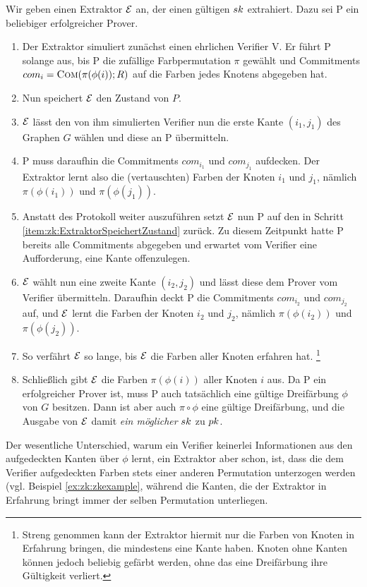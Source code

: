 \begin{beweis}
	Wir geben einen Extraktor $\mathcal{E}$ an, der einen gültigen $sk$ extrahiert. Dazu sei P ein beliebiger erfolgreicher Prover.
	
	\begin{enumerate}
		\item Der Extraktor simuliert zunächst einen ehrlichen Verifier V. Er führt P solange aus, bis P die zufällige Farbpermutation $\pi$ gewählt und Commitments $com_i = \textsc{Com}(\pi(\phi(i));R)$ auf die Farben jedes Knotens abgegeben hat.	
		\item \label{item:zk:ExtraktorSpeichertZustand}
		Nun speichert $\mathcal{E}$ den Zustand von $P$.
		\item $\mathcal{E}$ lässt den von ihm simulierten Verifier nun die erste Kante $(i_1, j_1)$ des Graphen $G$ wählen und diese an P übermitteln.
		\item P muss daraufhin die Commitments $com_{i_1}$ und $com_{j_1}$ aufdecken. Der Extraktor lernt also die (vertauschten) Farben der Knoten $i_1$ und $j_1$, nämlich $\pi(\phi(i_1))$ und $\pi(\phi(j_1))$.
		\item Anstatt des Protokoll weiter auszuführen setzt $\mathcal{E}$ nun P auf den in Schritt \ref{item:zk:ExtraktorSpeichertZustand} zurück. Zu diesem Zeitpunkt hatte P bereits alle Commitments abgegeben und erwartet vom Verifier eine Aufforderung, eine Kante offenzulegen.
		\item $\mathcal{E}$ wählt nun eine zweite Kante $(i_2, j_2)$ und lässt diese dem Prover vom Verifier übermitteln. Daraufhin deckt P die Commitments $com_{i_2}$ und $com_{j_2}$ auf, und $\mathcal{E}$ lernt die Farben der Knoten $i_2$ und $j_2$, nämlich $\pi(\phi(i_2))$ und $\pi(\phi(j_2))$.
		\item So verfährt $\mathcal{E}$ so lange, bis $\mathcal{E}$ die Farben aller Knoten erfahren hat.
		\footnote{Streng genommen kann der Extraktor hiermit nur die Farben von Knoten in Erfahrung bringen, die mindestens eine Kante haben. Knoten ohne Kanten können jedoch beliebig gefärbt werden, ohne das eine Dreifärbung ihre Gültigkeit verliert.}
		\item Schließlich gibt $\mathcal{E}$ die Farben $\pi(\phi(i))$ aller Knoten $i$ aus. Da P ein erfolgreicher Prover ist, muss P auch tatsächlich eine gültige Dreifärbung $\phi$ von $G$ besitzen. Dann ist aber auch $\pi \circ \phi$ eine gültige Dreifärbung, und die Ausgabe von $\mathcal{E}$ damit \emph{ein möglicher} $sk$ zu $pk$.
	\end{enumerate}
\end{beweis}

Der wesentliche Unterschied, warum ein Verifier keinerlei Informationen aus den aufgedeckten Kanten über $\phi$ lernt, ein Extraktor aber schon, ist, dass die dem Verifier aufgedeckten Farben stets einer anderen Permutation unterzogen werden (vgl. Beispiel \ref{ex:zk:zkexample}, während die Kanten, die der Extraktor in Erfahrung bringt immer der selben Permutation unterliegen.

